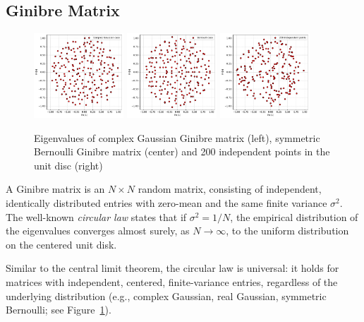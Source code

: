 \documentclass{article}
\begin{document}
	\subsection{Ginibre Matrix} 

	\begin{figure}[htbp]
		\centering
		\includegraphics[width=0.3\textwidth]{figures/intro_complexGaussian.pdf}	
		\includegraphics[width=0.3\textwidth]{figures/intro_bernoulli.pdf}
		\includegraphics[width=0.3\textwidth]{figures/intro_independent.pdf}
		\caption{ Eigenvalues of complex Gaussian Ginibre matrix (left), symmetric Bernoulli Ginibre matrix (center) and 
		200 independent points in the unit disc (right)}
		\label{fig:eigenvalues}
	\end{figure}

	A Ginibre matrix is an $N\times N$ random matrix, 
	consisting of independent, identically distributed entries 
	with zero-mean and the same finite variance $\sigma^2$. 
	The well-known \emph{circular law}
	\cite{Ginibre-1965, Girko-1984,Bai-1997,Gotze-Tikhomirov-2010,Tao-Vu-2010}  
	states that if $\sigma^2 = 1/N$, the empirical distribution of the eigenvalues converges almost surely,
	as $N \to \infty$, to the uniform distribution on the centered unit disk.	


	Similar to the central limit theorem, the circular law is universal:  
	it holds for matrices with independent, centered, finite-variance entries,  
	regardless of the underlying distribution (e.g., complex Gaussian, real Gaussian, symmetric Bernoulli; 
	see Figure~\ref{fig:eigenvalues}).
\end{document}
